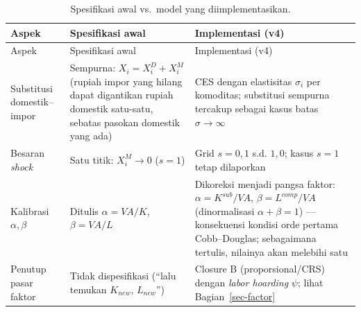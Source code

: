 \documentclass[
  manuscript=article,
  layout=publish,
  year=2026,
  volume=1,
]{den}
\begin{document}
\begin{longtable}[]{@{}
  >{\raggedright\arraybackslash}p{}
  >{\raggedright\arraybackslash}p{}
  >{\raggedright\arraybackslash}p{}@{}}
\caption{Spesifikasi awal vs.~model yang
diimplementasikan.}\label{tbl-vsboss}\tabularnewline
\toprule\noalign{}
\begin{minipage}[b]{\linewidth}\raggedright
Aspek
\end{minipage} & \begin{minipage}[b]{\linewidth}\raggedright
Spesifikasi awal
\end{minipage} & \begin{minipage}[b]{\linewidth}\raggedright
Implementasi (v4)
\end{minipage} \\
\midrule\noalign{}
\endfirsthead
\toprule\noalign{}
\begin{minipage}[b]{\linewidth}\raggedright
Aspek
\end{minipage} & \begin{minipage}[b]{\linewidth}\raggedright
Spesifikasi awal
\end{minipage} & \begin{minipage}[b]{\linewidth}\raggedright
Implementasi (v4)
\end{minipage} \\
\midrule\noalign{}
\endhead
\bottomrule\noalign{}
\endlastfoot
Substitusi domestik--impor & Sempurna: \(X_i = X_i^D + X_i^M\) (rupiah
impor yang hilang dapat digantikan rupiah domestik satu-satu, sebatas
pasokan domestik yang ada) & CES dengan elastisitas \(\sigma_i\) per
komoditas; substitusi sempurna tercakup sebagai kasus batas
\(\sigma \to \infty\) \\
Besaran \emph{shock} & Satu titik: \(X_i^M \to 0\) (\(s = 1\)) & Grid
\(s = 0{,}1\) s.d. \(1{,}0\); kasus \(s = 1\) tetap dilaporkan \\
Kalibrasi \(\alpha, \beta\) & Ditulis \(\alpha = VA/K\),
\(\beta = VA/L\) & Dikoreksi menjadi pangsa faktor:
\(\alpha = K^{sub}/VA\), \(\beta = L^{comp}/VA\) (dinormalisasi
\(\alpha + \beta = 1\)) --- konsekuensi kondisi orde pertama
Cobb--Douglas; sebagaimana tertulis, nilainya akan melebihi satu \\
Penutup pasar faktor & Tidak dispesifikasi (``lalu temukan \(K_{new}\),
\(L_{new}\)'') & Closure B (proporsional/CRS) dengan \emph{labor
hoarding} \(\psi\); lihat Bagian~\ref{sec-factor} \\
\end{longtable}
\end{document}
